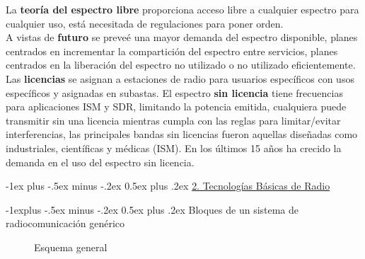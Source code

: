 \documentclass[10pt,portrait, twocolumn]{article}
\makeatletter
\renewcommand{\section}{\@startsection{section}{1}{0mm}%
                                {-1ex plus -.5ex minus -.2ex}%
                                {0.5ex plus .2ex}%
                                {\normalfont\large\bfseries}}
\renewcommand{\subsection}{\@startsection{subsection}{2}{0mm}%
                                {-1explus -.5ex minus -.2ex}%
                                {0.5ex plus .2ex}%
                                {\normalfont\normalsize\bfseries}}
\makeatother
\begin{document}
La \textbf{teoría del espectro libre} proporciona acceso libre a cualquier espectro para cualquier uso, está necesitada de regulaciones para poner orden.\\

A vistas de \textbf{futuro} se preveé una mayor demanda del espectro disponible, planes centrados en incrementar la compartición del espectro entre servicios, planes centrados en la liberación del espectro no utilizado o no utilizado eficientemente.\\

Las \textbf{licencias} se asignan a estaciones de radio para usuarios específicos con usos específicos y asignadas en subastas. El espectro \textbf{sin licencia} tiene frecuencias para aplicaciones ISM y SDR, limitando la potencia emitida, cualquiera puede transmitir sin una licencia mientras cumpla con las reglas para limitar/evitar interferencias, las principales bandas sin licencias fueron aquellas diseñadas como industriales, científicas y médicas (ISM). En los últimos 15 años ha crecido la demanda en el uso del espectro sin licencia.

\hrulefill

\section{\underline{2. Tecnologías Básicas de Radio}}

\subsection{Bloques de un sistema de radiocomunicación genérico}

\begin{figure}[h]
	\centering
      \caption{Esquema general}
  \end{figure}
\end{document}

